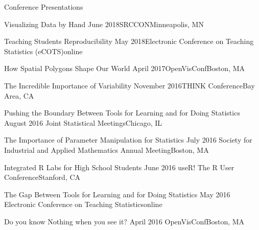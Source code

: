 \documentclass{resume} %
\begin{document}
\begin{rSection}{Conference Presentations}

\begin{sSubsection}{Visualizing Data by Hand}{ }{June 2018}{SRCCON}{Minneapolis, MN}
\end{sSubsection}

\begin{sSubsection}{Teaching Students Reproducibility}{ }{May 2018}{Electronic Conference on Teaching Statistics (eCOTS)}{online}
\end{sSubsection}

\begin{sSubsection}{How Spatial Polygons Shape Our World}{ }{April 2017}{OpenVisConf}{Boston, MA}
\end{sSubsection}

\begin{sSubsection}{The Incredible Importance of Variability}{ }{November 2016}{THINK Conference}{Bay Area, CA}
\end{sSubsection}

\begin{sSubsection}{Pushing the Boundary Between Tools for Learning and for Doing Statistics}{ }{August 2016 }{Joint Statistical Meetings}{Chicago, IL}
\end{sSubsection}

\begin{sSubsection}{The Importance of Parameter Manipulation for Statistics}{ }{July 2016 }{Society for Industrial and Applied Mathematics Annual Meeting}{Boston, MA}
\end{sSubsection}

\begin{sSubsection}{Integrated R Labs for High School Students}{ }{June 2016 }{useR! The R User Conference}{Stanford, CA}
\end{sSubsection}

\begin{sSubsection}{The Gap Between Tools for Learning and for Doing Statistics}{ }{May 2016 }{Electronic Conference on Teaching Statistics}{online}
\end{sSubsection}

\begin{sSubsection}{Do you know Nothing when you see it?}{ }{April 2016 }{OpenVisConf}{Boston, MA}
\end{sSubsection}


\end{rSection}
\end{document}
